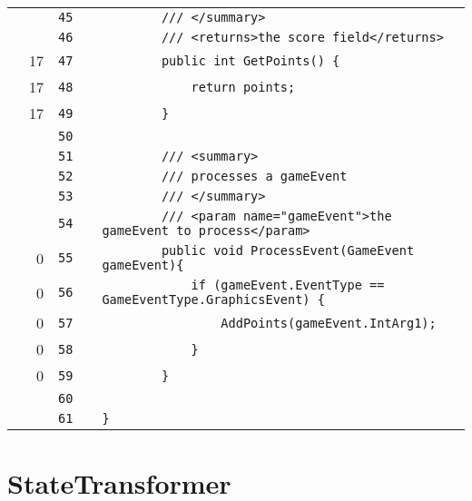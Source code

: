 \documentclass[a4paper,landscape,10pt]{article}
\begin{document}
\begin{longtable}[l]{lrrll}
\cellcolor{gray} &  & \verb~45~ & & \verb~        /// </summary>~\\
\cellcolor{gray} &  & \verb~46~ & & \verb~        /// <returns>the score field</returns>~\\
\cellcolor{green} & 17 & \verb~47~ & & \verb~        public int GetPoints() {~\\
\cellcolor{green} & 17 & \verb~48~ & & \verb~            return points;~\\
\cellcolor{green} & 17 & \verb~49~ & & \verb~        }~\\
\cellcolor{gray} &  & \verb~50~ & & \verb~~\\
\cellcolor{gray} &  & \verb~51~ & & \verb~        /// <summary>~\\
\cellcolor{gray} &  & \verb~52~ & & \verb~        /// processes a gameEvent~\\
\cellcolor{gray} &  & \verb~53~ & & \verb~        /// </summary>~\\
\cellcolor{gray} &  & \verb~54~ & & \verb~        /// <param name="gameEvent">the gameEvent to process</param>~\\
\cellcolor{red} & 0 & \verb~55~ & & \verb~        public void ProcessEvent(GameEvent gameEvent){~\\
\cellcolor{red} & 0 & \verb~56~ & & \verb~            if (gameEvent.EventType == GameEventType.GraphicsEvent) {~\\
\cellcolor{red} & 0 & \verb~57~ & & \verb~                AddPoints(gameEvent.IntArg1);~\\
\cellcolor{red} & 0 & \verb~58~ & & \verb~            }~\\
\cellcolor{red} & 0 & \verb~59~ & & \verb~        }~\\
\cellcolor{gray} &  & \verb~60~ & & \verb~~\\
\cellcolor{gray} &  & \verb~61~ & & \verb~}~\\
\end{longtable}
\newpage
\section{StateTransformer}
\end{document}

